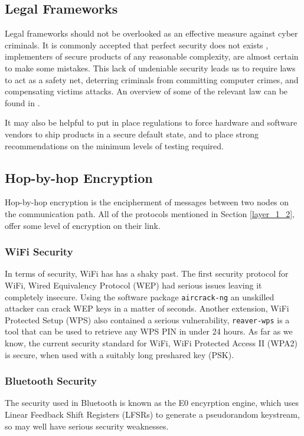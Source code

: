 \documentclass[10pt,journal,compsoc]{IEEEtran}
\begin{document}
\subsection{Legal Frameworks}
Legal frameworks should not be overlooked as an effective measure against cyber
criminals. It is commonly accepted that perfect security does not exists
\cite{ThereMustBeA}, implementers of secure products of any reasonable
complexity, are almost certain to make some mistakes. This lack of undeniable
security leads us to require laws to act as a safety net, deterring criminals
from committing computer crimes, and compensating victims attacks. An overview
of some of the relevant law can be found in \cite{Weber2010}. 

It may also be helpful to put in place regulations to force hardware and
software vendors to ship products in a secure default state, and to place
strong recommendations on the minimum levels of testing required. 

\subsection{Hop-by-hop Encryption}
Hop-by-hop encryption is the encipherment of messages between two nodes on the
communication path. All of the  protocols mentioned in Section \ref{layer_1_2}, offer
some level of encryption on their link. 

\subsubsection{WiFi Security}
In terms of security, WiFi has has a shaky past. The first security protocol
for WiFi, Wired Equivalency Protocol (WEP) had serious issues leaving it
completely insecure. Using the software package {\tt aircrack-ng} an
unskilled attacker can crack WEP keys in a matter of seconds. Another
extension, WiFi Protected Setup (WPS) also contained a serious
vulnerability, {\tt reaver-wps} is a tool that can be used to retrieve any
WPS PIN in under 24 hours. As far as we know, the current security standard
for WiFi, WiFi Protected Access II (WPA2) is secure, when used with a
suitably long preshared key (PSK). 

\subsubsection{Bluetooth Security}
The security used in Bluetooth is known as the E0 encyrption engine, which uses
Linear Feedback Shift Registers (LFSRs) to generate a pseudorandom keystream,
so may well have serious security weaknesses.
\end{document}
